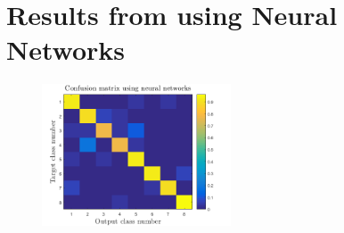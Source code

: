 \section{Results from using Neural Networks}

\begin{figure}[H]
\centering
\includegraphics[width=0.5\textwidth]{./figure/result/NeuralNetworks/confusion.png}
\caption{\label{fig:resut_NN_confusion}}
\end{figure}